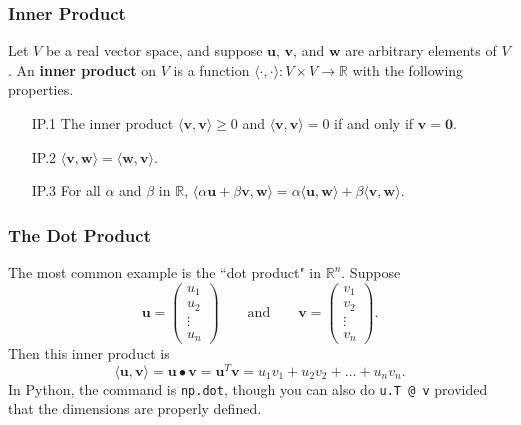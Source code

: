 \documentclass{beamer}
\begin{document}
\begin{frame}
\frametitle{Inner Product}

\begin{Definition}
Let $V$ be a real vector space, and suppose ${\boldsymbol  u}$, ${\boldsymbol  v}$, and ${\boldsymbol  w}$ are arbitrary elements of $V$. An {\bf inner product} on $V$ is a function $\langle\cdot ,\cdot\rangle:V\times V\to \mathbb{R}$ with the following properties.
\begin{enumerate}
\item[IP.1] The inner product $\langle {\boldsymbol v}, {\boldsymbol v}\rangle \geq 0$ and $\langle {\boldsymbol v}, {\boldsymbol v}\rangle = 0$ if and only if ${\boldsymbol v} = {\boldsymbol  0}$.
\item[IP.2] $\langle {\boldsymbol v}, {\boldsymbol  w}\rangle = \langle {\boldsymbol w}, {\boldsymbol  v}\rangle$.
\item[IP.3] For all $\alpha$ and $\beta$ in $\mathbb{R}$,
$\langle \alpha {\boldsymbol u} + \beta {\boldsymbol v}, {\boldsymbol w}\rangle= \alpha \langle {\boldsymbol u}, {\boldsymbol w}\rangle + \beta \langle {\boldsymbol v}, {\boldsymbol w}\rangle.$
\end{enumerate}
\end{Definition}

\end{frame}

\begin{frame}
\frametitle{The Dot Product}

The most common example is the ``dot product" in $\mathbb{R}^n$. Suppose
$$
{\boldsymbol u} = \left(\begin{array}{c} u_1\\ u_2\\ \vdots\\ u_n\end{array}\right)\qquad\text{and}\qquad {\boldsymbol v} = \left(\begin{array}{c} v_1\\ v_2\\ \vdots\\ v_n\end{array}\right).
$$
Then this inner product is
$$
\langle {\boldsymbol u}, {\boldsymbol v}\rangle = {\boldsymbol u} \bullet {\boldsymbol v} =  {\boldsymbol u}^T {\boldsymbol v} = u_1v_1 + u_2v_2 +\ldots + u_n v_n.
$$
In Python, the command is \texttt{np.dot}, though you can also do \texttt{u.T @ v} provided that the dimensions are properly defined.

\end{frame}
\end{document}
